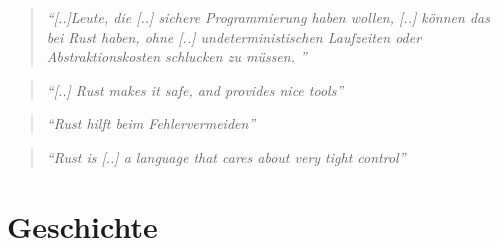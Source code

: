 \begin{quotation}
	\textit{\enquote{[..]Leute, die [..] sichere Programmierung haben wollen, [..] können das bei Rust haben, ohne [..] undeterministischen Laufzeiten oder Abstraktionskosten schlucken zu müssen. }}
	\cite[Felix von Leitner in einem Blogeintrag]{rust:fefe}
\end{quotation}

\begin{quotation}
	\textit{\enquote{[..] Rust makes it safe, and  provides nice tools}} 
	\cite[Folie 130, Federico Mena-Quintero in \enquote{Ersetzen von C Bibliotheken durch Rust}]{rust:c_is_hostile_mena}
\end{quotation}

\begin{quotation}
	\textit{\enquote{Rust hilft beim Fehlervermeiden}} 
	\cite[Federico Mena-Quintero in einem Interview]{rust:c_is_hostile_golem}
\end{quotation}

\begin{quotation}
	\textit{\enquote{Rust is [..] a language that cares about very tight control}}
	\cite[Diskussion zwischen Programmierern auf Reddit]{rust:tight_control}
\end{quotation}






\clearpage
\section{Geschichte}
\label{rust:history}

